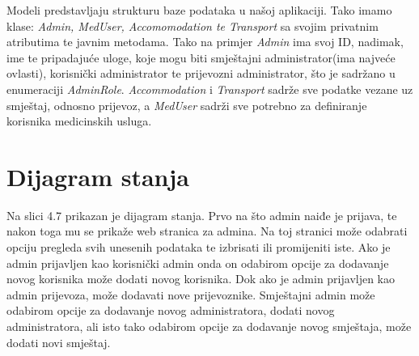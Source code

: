 			{Modeli predstavljaju strukturu baze podataka u našoj aplikaciji. Tako imamo klase: \textit{Admin, MedUser, Accomomodation te Transport} sa svojim privatnim atributima te javnim metodama. Tako na primjer \textit{Admin} ima svoj ID, nadimak, ime te pripadajuće uloge, koje mogu biti smještajni administrator(ima najveće ovlasti), korisnički administrator te prijevozni administrator, što je sadržano u enumeraciji \textit{AdminRole}. \textit{Accommodation} i \textit{Transport} sadrže sve podatke vezane uz smještaj, odnosno prijevoz, a \textit{MedUser} sadrži sve potrebno za definiranje korisnika medicinskih usluga. }\\
			
			
			
			
			
			
			
			\eject
		
		\section{Dijagram stanja}
			
			{Na slici 4.7 prikazan je dijagram stanja. Prvo na što admin naiđe je prijava, te nakon toga mu se prikaže web stranica za admina. Na toj stranici može odabrati opciju pregleda svih unesenih podataka te izbrisati ili promijeniti iste. Ako je admin prijavljen kao korisnički admin onda on odabirom opcije za 
			dodavanje novog korisnika može dodati novog korisnika. Dok ako je admin prijavljen kao admin prijevoza, može dodavati nove prijevoznike. Smještajni admin može odabirom opcije za dodavanje novog administratora, dodati novog administratora, ali isto tako odabirom opcije za dodavanje novog smještaja, može dodati novi smještaj.  }
			

